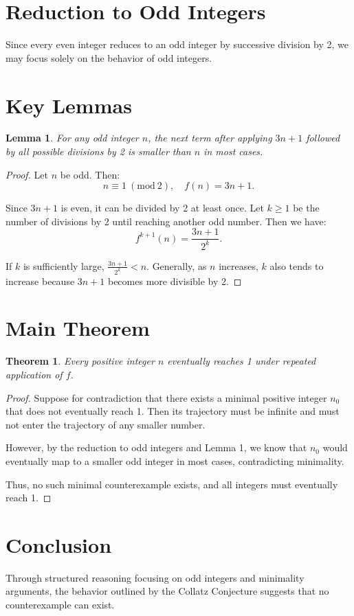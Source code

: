 \documentclass{article}
\newtheorem{theorem}{Theorem}
\newtheorem{lemma}{Lemma}
\begin{document}
\section{Reduction to Odd Integers}

Since every even integer reduces to an odd integer by successive division by 2, we may focus solely on the behavior of odd integers.

\section{Key Lemmas}

\begin{lemma}
For any odd integer $n$, the next term after applying $3n+1$ followed by all possible divisions by 2 is smaller than $n$ in most cases.
\end{lemma}

\begin{proof}
Let $n$ be odd. Then:
\[n \equiv 1 \ (\mathrm{mod} \ 2), \quad f(n) = 3n + 1.
\]

Since $3n + 1$ is even, it can be divided by 2 at least once. Let $k \geq 1$ be the number of divisions by 2 until reaching another odd number. Then we have:
\[
    f^{k+1}(n) = \frac{3n+1}{2^k}.
\]

If $k$ is sufficiently large, $\frac{3n+1}{2^k} < n$. Generally, as $n$ increases, $k$ also tends to increase because $3n+1$ becomes more divisible by 2.
\end{proof}

\section{Main Theorem}

\begin{theorem}
Every positive integer $n$ eventually reaches 1 under repeated application of $f$.
\end{theorem}

\begin{proof}
Suppose for contradiction that there exists a minimal positive integer $n_0$ that does not eventually reach 1. Then its trajectory must be infinite and must not enter the trajectory of any smaller number.

However, by the reduction to odd integers and Lemma 1, we know that $n_0$ would eventually map to a smaller odd integer in most cases, contradicting minimality.

Thus, no such minimal counterexample exists, and all integers must eventually reach 1.
\end{proof}

\section{Conclusion}

Through structured reasoning focusing on odd integers and minimality arguments, the behavior outlined by the Collatz Conjecture suggests that no counterexample can exist.
\end{document}
